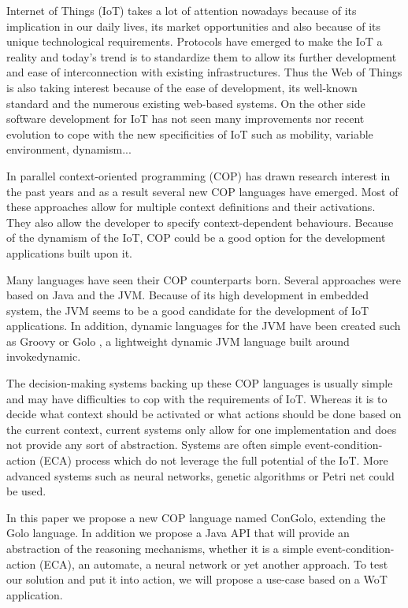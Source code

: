 \documentclass[a4paper]{article}
\begin{document}
Internet of Things (IoT) takes a lot of attention nowadays because of its implication in our daily lives, its market opportunities and also because of its unique technological requirements. Protocols have emerged to make the IoT a reality and today's trend is to standardize them to allow its further development and ease of interconnection with existing infrastructures. Thus the Web of Things is also taking interest because of the ease of development, its well-known standard and the numerous existing web-based systems. On the other side software development for IoT has not seen many improvements nor recent evolution to cope with the new specificities of IoT such as mobility, variable environment, dynamism...

In parallel context-oriented programming (COP) has drawn research interest in the past years and as a result several new COP languages have emerged. Most of these approaches allow for multiple context definitions and their activations. They also allow the developer to specify context-dependent behaviours. Because of the dynamism of the IoT, COP could be a good option for the development applications built upon it.

Many languages have seen their COP counterparts born. Several approaches were based on Java and the JVM. Because of its high development in embedded system, the JVM seems to be a good candidate for the development of IoT applications. In addition, dynamic languages for the JVM have been created such as Groovy or Golo \cite{ponge_golo_2013}, a lightweight dynamic JVM language built around invokedynamic.

The decision-making systems backing up these COP languages is usually simple and may have difficulties to cop with the requirements of IoT. Whereas it is to decide what context should be activated or what actions should be done based on the current context, current systems only allow for one implementation and does not provide any sort of abstraction. Systems are often simple event-condition-action (ECA) process which do not leverage the full potential of the IoT. More advanced systems such as neural networks, genetic algorithms or Petri net could be used.

In this paper we propose a new COP language named ConGolo, extending the Golo language. In addition we propose a Java API that will provide an abstraction of the reasoning mechanisms, whether it is a simple event-condition-action (ECA), an automate, a neural network or yet another approach. To test our solution and put it into action, we will propose a use-case based on a WoT application.
\end{document}
